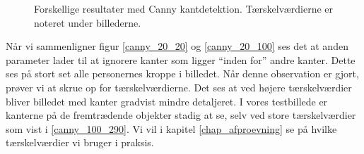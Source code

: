 {\begin{figure}[!h]
    \caption[]{Forskellige resultater med Canny kantdetektion.
    Tærskelværdierne er noteret under billederne.}
    \label{simple_metode}
\end{figure}

Når vi sammenligner figur \ref{canny_20_20} og \ref{canny_20_100} ses
det at anden parameter lader til at ignorere kanter som ligger
``inden for'' andre kanter. Dette ses på stort set alle personernes
kroppe i billedet. Når denne observation er gjort, prøver vi at skrue op
for tærskelværdierne. Det ses at ved højere tærskelværdier bliver
billedet med kanter gradvist mindre detaljeret. I vores testbillede er
kanterne på de fremtrædende objekter stadig at se, selv ved store
tærskelværdier som vist i \ref{canny_100_290}. Vi vil i kapitel \ref{chap_afproevning} se på hvilke
tærskelværdier vi bruger i praksis.
}

